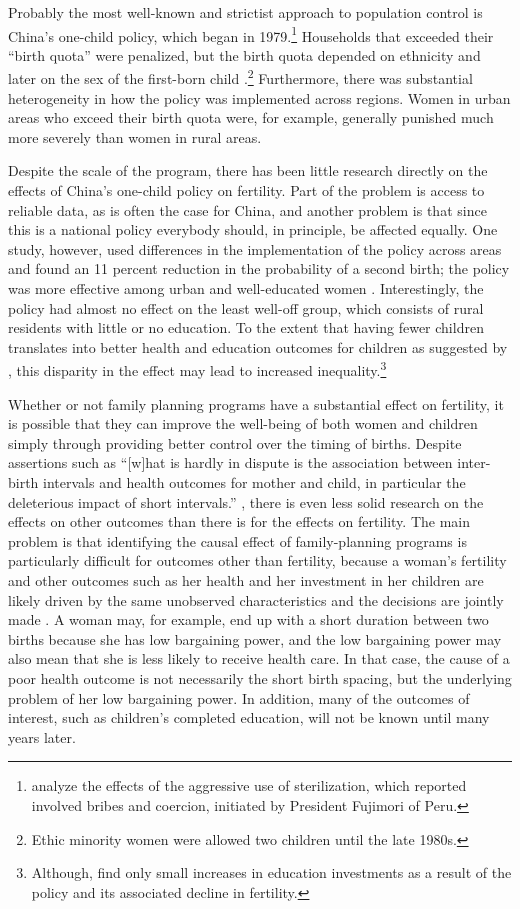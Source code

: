 Probably the most well-known and strictist approach to population control is China's one-child policy, which began in 1979.\footnote{\citet{Byker2012} analyze the effects of the aggressive use of sterilization, which reported involved bribes and coercion, initiated by President Fujimori of Peru.} Households that exceeded their ``birth quota'' were penalized, but the birth quota depended on ethnicity and later on the sex of the first-born child \citep{Li2005}.\footnote{Ethic minority women were allowed two children until the late 1980s.} Furthermore, there was substantial heterogeneity in how the policy was implemented across regions. Women in urban areas who exceed their birth quota were, for example, generally punished much more severely than women in rural areas.

Despite the scale of the program, there has been little research directly on the effects of China's one-child policy on fertility. Part of the problem is access to reliable data, as is often the case for China, and another problem is that since this is a national policy everybody should, in principle, be affected equally. One study, however, used differences in the implementation of the policy across areas and found an 11 percent reduction in the probability of a second birth; the policy was more effective among urban and well-educated women \citep{Li2005}. Interestingly, the policy had almost no eﬀect on the least well-oﬀ group, which consists of rural residents with little or no education. To the extent that having fewer children translates into better health and education outcomes for children as suggested by \citet{becker73}, this disparity in the effect may lead to increased inequality.\footnote{Although, \citet{Rosenzweig2009} find only small increases in education investments as a result of the policy and its associated decline in fertility.}

Whether or not family planning programs have a substantial effect on fertility, it is possible that they can improve the well-being of both women and children simply through providing better control over the timing of births. Despite assertions such as ``{[}w{]}hat is hardly in dispute is the association between inter-birth intervals and health outcomes for mother and child, in particular the deleterious impact of short intervals.'' \citep[p. 175]{Casterline2016}, there is even less solid research on the effects on other outcomes than there is for the effects on fertility. The main problem is that identifying the causal effect of family-planning programs is particularly difficult for outcomes other than fertility, because a woman's fertility and other outcomes such as her health and her investment in her children are likely driven by the same unobserved characteristics and the decisions are jointly made \citep{Schultz2005}. A woman may, for example, end up with a short duration between two births because she has low bargaining power, and the low bargaining power may also mean that she is less likely to receive health care. In that case, the cause of a poor health outcome is not necessarily the short birth spacing, but the underlying problem of her low bargaining power. In addition, many of the outcomes of interest, such as children's completed education, will not be known until many years later.

